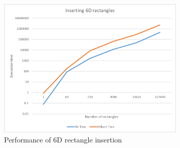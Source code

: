 \documentclass[11pt, a4paper, oneside]{article}
\begin{document}
\begin{figure}[H]
  \centering
    \includegraphics[width=0.8\textwidth]{img/insert6D}
      \caption{Performance of 6D rectangle insertion}
  \label{fig:insert6D}
\end{figure}
\end{document}
